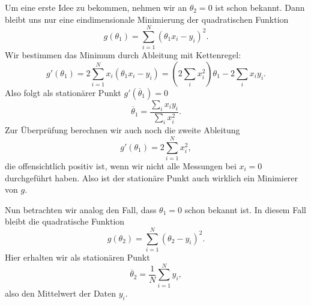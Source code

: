 Um eine erste Idee zu bekommen, nehmen wir an \(\theta_2 = 0\) ist schon bekannt. Dann bleibt uns nur eine eindimensionale Minimierung der quadratischen Funktion
\begin{equation*}
 g(\theta_1) =  \sum_{i=1}^N (\theta_1 x_i   -y_i)^2 .
\end{equation*}
Wir bestimmen das Minimum durch Ableitung mit Kettenregel:
\begin{equation*}
 g'(\theta_1) = 2 \sum_{i=1}^N x_i (\theta_1 x_i   -y_i) = (2 \sum_i x_i^2) \theta_1 - 2 \sum_i x_i y_i.\end{equation*}
Also folgt als stationärer Punkt \(g'(\overline{\theta}_1) = 0\)
\begin{equation*}
 \overline{\theta}_1 = \frac{\sum_i x_i y_i}{\sum_i x_i^2}.
\end{equation*}
Zur Überprüfung berechnen wir auch noch die zweite Ableitung
\begin{equation*}
 g'(\theta_1) =  2 \sum_{i=1}^N x_i^2,\end{equation*}
die offensichtlich positiv ist, wenn wir nicht alle Messungen bei \(x_i = 0\) durchgeführt haben. Also ist der stationäre Punkt auch wirklich ein Minimierer von \(g\).

Nun betrachten wir analog den Fall, dass \(\theta_1 = 0\) schon bekannt ist. In diesem Fall bleibt die quadratische Funktion
\begin{equation*}
  g(\theta_2) =  \sum_{i=1}^N (\theta_2   -y_i)^2 .
\end{equation*}
Hier erhalten wir als stationären Punkt
\begin{equation*}
 \overline{\theta}_2 = \frac{1}N  \sum_{i=1}^N y_i,\end{equation*}
also den Mittelwert der Daten \(y_i\).

